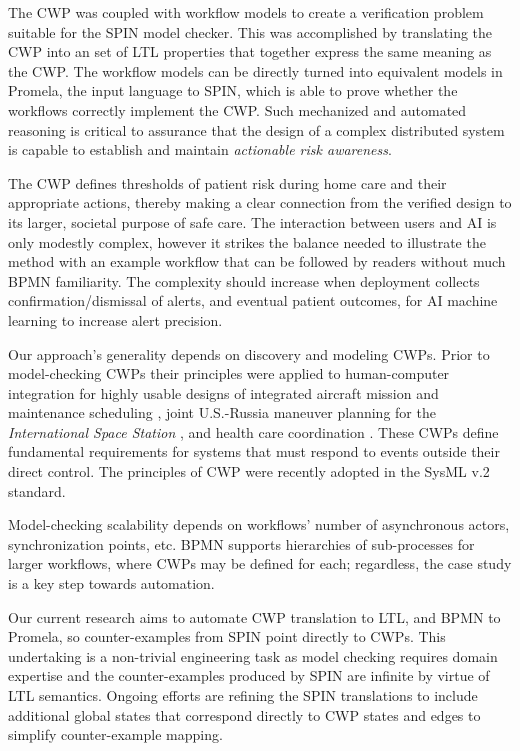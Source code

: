 The CWP was coupled with workflow models to create a verification problem suitable for the SPIN model checker. This was accomplished by translating the CWP into an set of LTL properties that together express the same meaning as the CWP. The workflow models can be directly turned into equivalent models in Promela, the input language to SPIN, which is able to prove whether the workflows correctly implement the CWP. Such mechanized and automated reasoning is critical to assurance that the design of a complex distributed system is capable to establish and maintain \emph{actionable risk awareness}. 

The CWP defines thresholds of patient risk during home care and their appropriate actions, thereby making a clear connection from the verified design to its larger, societal purpose of safe care. The interaction between users and AI is only modestly complex, however it strikes the balance needed to illustrate the method with an example workflow that can be followed by readers without much BPMN familiarity. 
The complexity should increase when deployment collects confirmation/dismissal of alerts, and eventual patient outcomes, for AI machine learning to increase alert precision.

Our approach's generality depends on discovery and modeling CWPs. Prior to model-checking CWPs their principles  were applied to human-computer integration for highly usable designs of integrated aircraft mission and maintenance scheduling \cite{workcentered}, joint U.S.-Russia maneuver planning for the \emph{International Space Station}  \cite{10.1145/1978942.1979311}, and health care coordination \cite{BERRY201615}. These CWPs define fundamental requirements for systems that must respond to events outside their direct control. The principles of CWP were recently adopted in the SysML v.2 standard.

Model-checking scalability depends on workflows' number of asynchronous actors, synchronization points, etc. BPMN supports hierarchies of sub-processes for larger workflows, where CWPs may be defined for each; regardless, the case study is a key step towards automation. 

Our current research aims to automate CWP translation to LTL, and BPMN to Promela, so counter-examples from SPIN point directly to CWPs. This undertaking is a non-trivial engineering task as model checking requires domain expertise and the counter-examples produced by SPIN are infinite by virtue of LTL semantics. Ongoing efforts are refining the SPIN translations to include additional global states that correspond directly to CWP states and edges to simplify counter-example mapping. 

